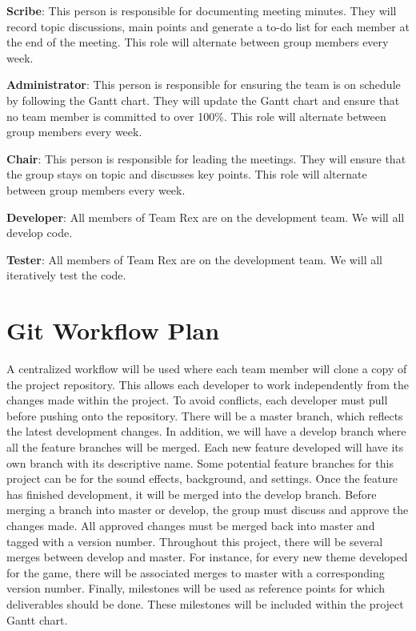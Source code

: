 \documentclass{article}
\begin{document}
	\textbf{Scribe}: This person is responsible for documenting meeting minutes. They will record topic discussions, main points and generate a to-do list for each member at the end of the meeting. This role will alternate between group members every week. 
	
	\textbf{Administrator}: This person is responsible for ensuring the team is on schedule by following the Gantt chart. They will update the Gantt chart and ensure that no team member is committed to over 100\%. This role will alternate between group members every week. 
	
	\textbf{Chair}: This person is responsible for leading the meetings. They will ensure that the group stays on topic and discusses key points. This role will alternate between group members every week. 
	
	\textbf{Developer}: All members of Team Rex are on the development team. We will all develop code. 
	
	\textbf{Tester}: All members of Team Rex are on the development team. We will all iteratively test the code. 
	
	
	
	\section{Git Workflow Plan}

	A centralized workflow will be used where each team member will clone a copy of the project repository.
	This allows each developer to work independently from the changes made within the project. 
	To avoid conflicts, each developer must pull before pushing onto the repository. 
	There will be a master branch, which reflects the latest development changes. 
	In addition, we will have a develop branch where all the feature branches will be merged.
	Each new feature developed will have its own branch with its descriptive name.
	Some potential feature branches for this project can be for the sound effects, background, and settings. 
	Once the feature has finished development, it will be merged into the develop branch. 
	Before merging a branch into master or develop, the group must discuss and approve the changes made. 
	All approved changes must be merged back into master and tagged with a version number. 
	Throughout this project, there will be several merges between develop and master. 
	For instance, for every new theme developed for the game, there will be associated merges to master with a corresponding version number. Finally, milestones will be used as reference points for which deliverables should be done. These milestones will be included within the project Gantt chart.
\end{document}
